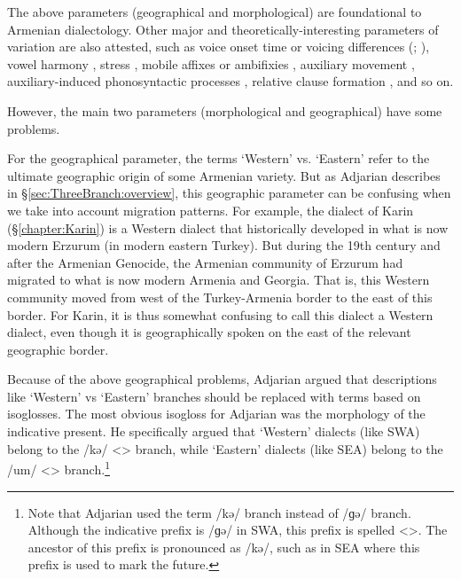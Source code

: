 The above parameters (geographical and morphological) are foundational to Armenian dialectology. Other       major and theoretically-interesting parameters of variation are also attested, such as voice onset time or voicing differences (\citealt[\S1.1.1]{Vaux-1998-ArmenianPhono}; \citealt{Baronian-2017-TwoProblemsArmenianPhono}), vowel harmony \citep{Vaux-1998-ArmenianPhono}, stress \citep{DeLisi-2018-ArmenianProsodyDiachrony}, mobile affixes or ambifixies \citep{BezrukovDolatian-2020-PLCArmenianMobile,Bezrukov-2022-DissCaucasusMotionArmenian}, auxiliary movement \citep{Comrie-1984-SomeFormalPropertiesFOcusEasternArmenian,KahnemuyipourMegerdoomian-2011-secondcliticvP,KahnemuyipourMegerdoomian-2017-positionalDistriutionFocus}, auxiliary-induced phonosyntactic processes \citep[\S3.3]{DolatianEtAl-prep-IranianGrammar}, relative clause formation \citep{Hodgson-2019-DissRelativeClauseArmenianSyntax}, and so on.

However, the main two parameters (morphological and geographical) have some problems. 

For the geographical parameter, the terms `Western' vs. `Eastern' refer to the ultimate geographic origin of some Armenian variety. But as Adjarian describes in \S\ref{sec:ThreeBranch:overview}, this geographic parameter can be confusing when we take into account migration patterns. For example, the dialect of Karin (\S\ref{chapter:Karin}) is a Western dialect that historically developed in what is now modern Erzurum (in modern eastern Turkey). But during the 19th century and after the Armenian Genocide, the Armenian community of Erzurum had migrated to what is now modern Armenia and Georgia. That is, this Western community moved from west of the Turkey-Armenia border to the east of this border. For Karin, it is thus somewhat confusing to call this dialect a Western dialect, even though it is geographically spoken on the east of the relevant geographic border. 

Because of the above geographical problems, Adjarian argued that descriptions like `Western' vs `Eastern' branches should be replaced with terms based on isoglosses. The most obvious isogloss for Adjarian was the morphology of the indicative present. He specifically argued that `Western' dialects (like SWA) belong to the /kə/ <> branch, while `Eastern' dialects (like SEA) belong to the /um/ <> branch.\footnote{Note that Adjarian used the term /kə/ branch instead of /ɡə/ branch. Although the indicative prefix is /ɡə/ in SWA, this prefix is spelled <>. The ancestor of this prefix is pronounced as /kə/, such as in SEA where this prefix is used to mark the  future.}

